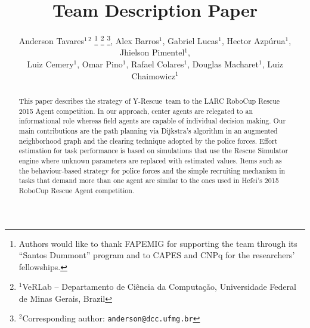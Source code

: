 \documentclass[a4paper, 10pt, conference]{ieeeconf}      %
\title{\teamname Team Description Paper}
\author{
	Anderson Tavares$^{1~2}$ 
		\thanks{Authors would like to thank FAPEMIG for supporting the team through its ``Santos Dummont'' program and to CAPES and CNPq for the researchers' fellowships.}
		\thanks{$^{1}$VeRLab -- Departamento de Ciência da Computação, Universidade Federal de Minas Gerais, Brazil}
		\thanks{$^{2}$Corresponding author: {\tt\small anderson@dcc.ufmg.br}}, Alex Barros$^{1}$, Gabriel Lucas$^{1}$,	 Hector Azpúrua$^{1}$, Jhielson Pimentel$^{1}$,\\ Luiz Cemery$^{1}$, 
		Omar Pino$^{1}$, Rafael Colares$^{1}$, Douglas Macharet$^{1}$, Luiz Chaimowicz$^{1}$ 
}
\newcommand{\teamname}{Y-Rescue~}
\begin{document}
\maketitle

\begin{abstract}
This paper describes the strategy of \teamname team to the LARC RoboCup Rescue 2015 Agent competition. %
In our approach, center agents are relegated to an informational role whereas field agents are capable of individual decision making. Our main contributions are the path planning via Dijkstra's algorithm in an augmented neighborhood graph and the clearing technique adopted by the police forces. %
Effort estimation for task performance is based on simulations that use the Rescue Simulator engine where unknown parameters are replaced with estimated values. Items such as the behaviour-based strategy for police forces and the simple recruiting mechanism in tasks that demand more than one agent are similar to the ones used in Hefei's 2015 RoboCup Rescue Agent competition.
\end{abstract}




















%






%

\end{document}
